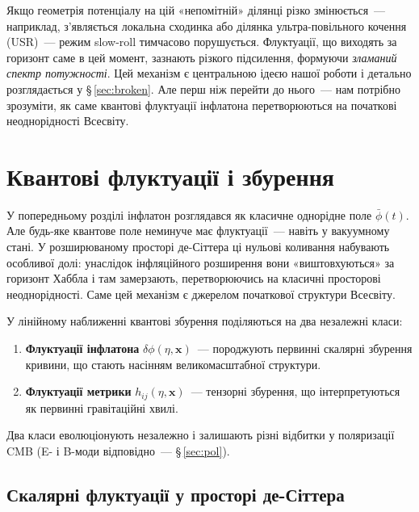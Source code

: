 \documentclass[12pt, a4paper]{article}
\begin{document}
Якщо геометрія потенціалу на цій «непомітній» ділянці різко
змінюється~--- наприклад, з'являється локальна сходинка або ділянка
ультра-повільного кочення (USR)~--- режим slow-roll тимчасово
порушується. Флуктуації, що виходять за горизонт саме в цей момент,
зазнають різкого підсилення, формуючи \emph{зламаний спектр
потужності}. Цей механізм є центральною ідеєю нашої роботи і
детально розглядається у §\,\ref{sec:broken}. Але перш ніж перейти
до нього~--- нам потрібно зрозуміти, як саме квантові флуктуації
інфлатона перетворюються на початкові неоднорідності Всесвіту.


\section{Квантові флуктуації і збурення}
\label{sec:quantum}

У попередньому розділі інфлатон розглядався як класичне однорідне
поле $\bar{\phi}(t)$. Але будь-яке квантове поле неминуче має
флуктуації~--- навіть у вакуумному стані. У розширюваному просторі
де-Сіттера ці нульові коливання набувають особливої долі: унаслідок
інфляційного розширення вони «виштовхуються» за горизонт Хаббла і
там замерзають, перетворюючись на класичні просторові неоднорідності.
Саме цей механізм є джерелом початкової структури Всесвіту.

У лінійному наближенні квантові збурення поділяються на два
незалежні класи:
\begin{enumerate}
  \item \textbf{Флуктуації інфлатона} $\delta\phi(\eta, \mathbf{x})$~---
        породжують первинні скалярні збурення кривини, що стають
        насінням великомасштабної структури.
  \item \textbf{Флуктуації метрики} $h_{ij}(\eta, \mathbf{x})$~---
        тензорні збурення, що інтерпретуються як первинні
        гравітаційні хвилі.
\end{enumerate}
Два класи еволюціонують незалежно і залишають різні відбитки
у поляризації CMB (E- і B-моди відповідно~--- §\,\ref{sec:pol}).

\subsection{Скалярні флуктуації у просторі де-Сіттера}
\end{document}
